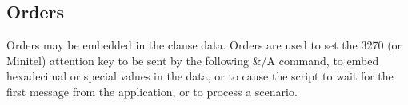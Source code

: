 \documentclass[letterpaper,10pt,english]{sphinxmanual}
\begin{document}
\ignorespaces 

\subsection{Orders}
\label{\detokenize{connectivity_guide:orders}}\label{\detokenize{connectivity_guide:index-123}}
\sphinxAtStartPar
Orders may be embedded in the clause data. Orders are used to set the 3270 (or Minitel) attention key to be sent by the following \&/A command, to embed hexadecimal or special values in the data, or to cause the script to wait for the first message from the application, or to process a scenario.
\end{document}
